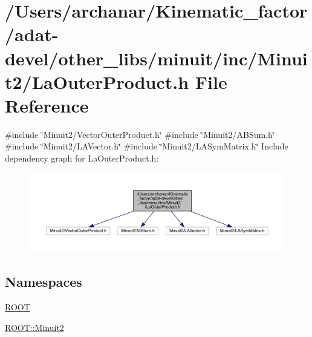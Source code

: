 \hypertarget{adat-devel_2other__libs_2minuit_2inc_2Minuit2_2LaOuterProduct_8h}{}\section{/\+Users/archanar/\+Kinematic\+\_\+factor/adat-\/devel/other\+\_\+libs/minuit/inc/\+Minuit2/\+La\+Outer\+Product.h File Reference}
\label{adat-devel_2other__libs_2minuit_2inc_2Minuit2_2LaOuterProduct_8h}
{\ttfamily \#include \char`\"{}Minuit2/\+Vector\+Outer\+Product.\+h\char`\"{}}\newline
{\ttfamily \#include \char`\"{}Minuit2/\+A\+B\+Sum.\+h\char`\"{}}\newline
{\ttfamily \#include \char`\"{}Minuit2/\+L\+A\+Vector.\+h\char`\"{}}\newline
{\ttfamily \#include \char`\"{}Minuit2/\+L\+A\+Sym\+Matrix.\+h\char`\"{}}\newline
Include dependency graph for La\+Outer\+Product.\+h\+:
\nopagebreak
\begin{figure}[H]
\begin{center}
\leavevmode
\includegraphics[width=350pt]{d5/d7b/adat-devel_2other__libs_2minuit_2inc_2Minuit2_2LaOuterProduct_8h__incl}
\end{center}
\end{figure}
\subsection*{Namespaces}
\begin{DoxyCompactItemize}
\item 
 \mbox{\hyperlink{namespaceROOT}{R\+O\+OT}}
\item 
 \mbox{\hyperlink{namespaceROOT_1_1Minuit2}{R\+O\+O\+T\+::\+Minuit2}}
\end{DoxyCompactItemize}
